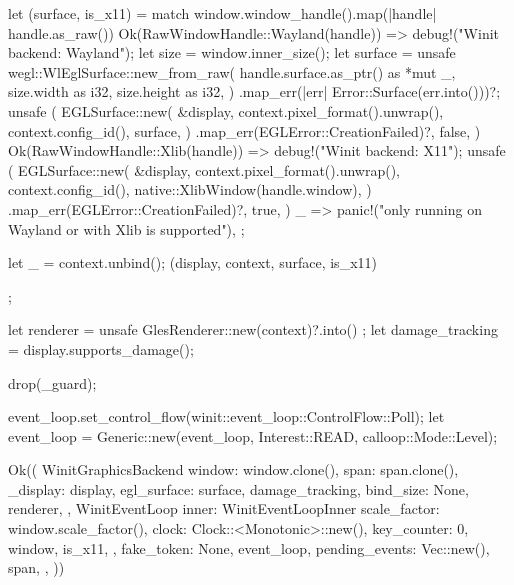 {{        let (surface, is_x11) = match window.window_handle().map(|handle| handle.as_raw()) {
            Ok(RawWindowHandle::Wayland(handle)) => {
                debug!("Winit backend: Wayland");
                let size = window.inner_size();
                let surface = unsafe {
                    wegl::WlEglSurface::new_from_raw(
                        handle.surface.as_ptr() as *mut _,
                        size.width as i32,
                        size.height as i32,
                    )
                }
                .map_err(|err| Error::Surface(err.into()))?;
                unsafe {
                    (
                        EGLSurface::new(
                            &display,
                            context.pixel_format().unwrap(),
                            context.config_id(),
                            surface,
                        )
                        .map_err(EGLError::CreationFailed)?,
                        false,
                    )
                }
            }
            Ok(RawWindowHandle::Xlib(handle)) => {
                debug!("Winit backend: X11");
                unsafe {
                    (
                        EGLSurface::new(
                            &display,
                            context.pixel_format().unwrap(),
                            context.config_id(),
                            native::XlibWindow(handle.window),
                        )
                        .map_err(EGLError::CreationFailed)?,
                        true,
                    )
                }
            }
            _ => panic!("only running on Wayland or with Xlib is supported"),
        };

        let _ = context.unbind();
        (display, context, surface, is_x11)
    };

    let renderer = unsafe { GlesRenderer::new(context)?.into() };
    let damage_tracking = display.supports_damage();

    drop(_guard);

    event_loop.set_control_flow(winit::event_loop::ControlFlow::Poll);
    let event_loop = Generic::new(event_loop, Interest::READ, calloop::Mode::Level);

    Ok((
        WinitGraphicsBackend {
            window: window.clone(),
            span: span.clone(),
            _display: display,
            egl_surface: surface,
            damage_tracking,
            bind_size: None,
            renderer,
        },
        WinitEventLoop {
            inner: WinitEventLoopInner {
                scale_factor: window.scale_factor(),
                clock: Clock::<Monotonic>::new(),
                key_counter: 0,
                window,
                is_x11,
            },
            fake_token: None,
            event_loop,
            pending_events: Vec::new(),
            span,
        },
    ))
}

